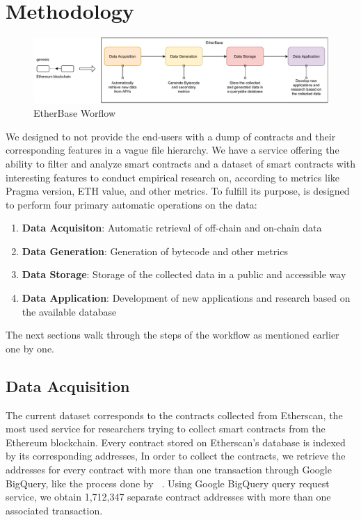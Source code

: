 \section{Methodology}

    \begin{figure}[t]
        \centering
        \includegraphics[width=1\textwidth]{figures/Untitled Diagram.pdf}
        \caption{EtherBase Worflow}
        \label{fig:my_label}
    \end{figure}
    
    We designed \etherbase to not provide the end-users with a dump of contracts and their corresponding features in a vague file hierarchy.
    We have a service offering the ability to filter and analyze smart contracts and a dataset of smart contracts with interesting features to conduct empirical research on, according to metrics like Pragma version, ETH value, and other metrics.
    To fulfill its purpose, \etherbase is designed to perform four primary automatic operations on the data:
    \begin{enumerate}
        \item \textbf{Data Acquisiton}: Automatic retrieval of off-chain and on-chain data
        \item \textbf{Data Generation}: Generation of bytecode and other metrics
        \item \textbf{Data Storage}: Storage of the collected data in a public and accessible way
        \item \textbf{Data Application}: Development of new applications and research based on the available database
    \end{enumerate}

    The next sections walk through the steps of the workflow as mentioned earlier one by one.

    \subsection{Data Acquisition}
        The current dataset corresponds to the contracts collected from Etherscan, the most used service for researchers trying to collect smart contracts from the Ethereum blockchain.
        Every contract stored on Etherscan's database is indexed by its corresponding addresses,
        In order to collect the contracts, we retrieve the addresses for every contract with more than one transaction through Google BigQuery, like the process done by ~\cite{Empirical-Evaluation-of-Smart-Contract-Testing:What-is-the-Best-Choice}.
        Using Google BigQuery query request service, we obtain 1,712,347 separate contract addresses with more than one associated transaction.

